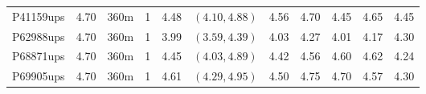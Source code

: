 \begin{landscape}
\begin{longtable}{cccc|cc|ccccc}
  P41159ups & 4.70 & 360m &   1 & 4.48 & $(4.10, 4.88)$ & 4.56 & 4.70 & 4.45 & 4.65 & 4.45 \\ 
  P62988ups & 4.70 & 360m &   1 & 3.99 & $(3.59, 4.39)$ & 4.03 & 4.27 & 4.01 & 4.17 & 4.30 \\ 
  P68871ups & 4.70 & 360m &   1 & 4.45 & $(4.03, 4.89)$ & 4.42 & 4.56 & 4.60 & 4.62 & 4.24 \\ 
  P69905ups & 4.70 & 360m &   1 & 4.61 & $(4.29, 4.95)$ & 4.50 & 4.75 & 4.70 & 4.57 & 4.30 \\ 
   \hline
\end{longtable}
\end{landscape}
\clearpage
